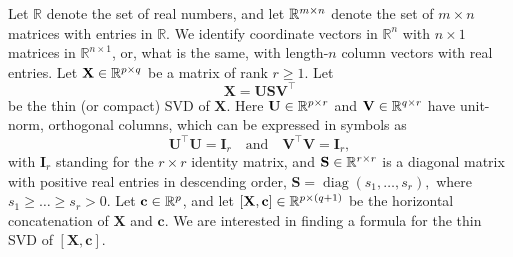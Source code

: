 \documentclass[11pt,a4paper]{article}
\theoremstyle{break}
\numberwithin{dummy}{section}
\theoremstyle{plain}
\theoremstyle{plain}
\theoremstyle{plain}
\theoremstyle{plain}
\theoremstyle{plain}
\theoremstyle{MyNonumberplain}
\DeclareMathOperator*{\diag}{diag}
\newcommand{\0}{\M{0}}
\newcommand{\M}[1]{\mathbf{#1}}
\newcommand{\R}{\mathbb{R}}
\newcommand{\T}{\top}
\newcommand{\ve}[1]{\mathbf{#1}}
\newcommand{\Mat}[2]{%
  \ifthenelse{\equal{#2}{1}}
  {\R^{#1}}
  {\R^{#1 \times #2}}
}
\begin{document}
Let $\R$ denote the set of real numbers, and let $\Mat{m}{n}$ denote the set of $m \times n$ matrices with entries in $\R$.  We identify coordinate vectors in $\R^n$ with $n \times 1$ matrices in $\R^{n \times 1}$, or, what is the same, with length-$n$ column vectors with real entries.  Let $\M{X} \in \Mat{p}{q}$ be a matrix of rank $r \geq 1$. Let
\begin{equation}
  \label{eq:1}
  \M{X} = \M{U} \M{S} \M{V}^\T
\end{equation}
be the thin (or compact) SVD of $\M{X}$.  Here $\M{U} \in \Mat{p}{r}$ and $\M{V} \in \Mat{q}{r}$ have unit-norm, orthogonal columns, which can be expressed in symbols as
\begin{displaymath}
  \M{U}^\T \M{U} = \M{I}_r
  \quad
  \text{and}
  \quad
  \M{V}^\T \M{V} = \M{I}_r,
\end{displaymath}
with $\M{I}_r$ standing for the $r \times r$ identity matrix, and $\M{S} \in \Mat{r}{r}$ is a diagonal matrix with positive real entries in descending order,
\begin{math}
  \M{S} = \diag(s_1, \dots, s_r),
\end{math}
where
\begin{math}
  s_1 \geq \dots \geq s_r > 0.
\end{math} 
Let $\ve{c} \in \Mat{p}{1}$, and let $[\M{X}, \ve{c}] \in \Mat{p}{(q+1)}$ be the horizontal concatenation of $\M{X}$ and $\ve{c}$.  We are interested in finding a formula for the thin SVD of $[\M{X}, \ve{c}]$.
\end{document}
